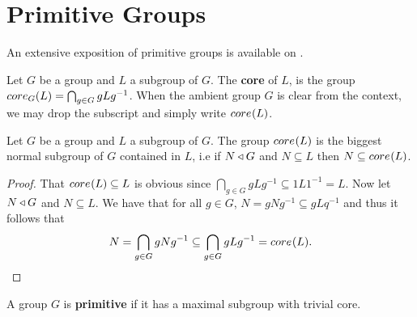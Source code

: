 \section{Primitive Groups}

An extensive exposition of primitive groups is available on \cite{Ballester-BolinchesCFG}.

\begin{definition}
    Let $G$ be a group and $L$ a subgroup of $G$. The \textbf{core} of $L$, is the group $\core[G]{L} = \bigcap_{g \in G} gLg^{-1}$. 
    When the ambient group $G$ is clear from the context, we may drop the subscript and simply write $\core{L}$. 
\end{definition}

\begin{theorem}
    Let $G$ be a group and $L$ a subgroup of $G$. The group $\core{L}$ is the biggest normal subgroup of $G$ contained in $L$, i.e if $N \nsub G$ and $N \subseteq L$ then $N \subseteq \core{L}$.
\end{theorem}

\begin{proof}
    That $\core{L} \subseteq L$ is obvious since $\bigcap_{g \in G} gLg^{-1} \subseteq 1L1^{-1} = L$. Now let $N \nsub G$ and $N \subseteq L$. We have that for all $g \in G$, $N = gNg^{-1} \subseteq gLq^{-1}$ and thus it follows that 
    $$
    N = \bigcap_{g \in G} gNg^{-1} \subseteq \bigcap_{g \in G} gLg^{-1} = \core{L}.
    $$
\end{proof}

\begin{definition}
    A group $G$ is \textbf{primitive} if it has a maximal subgroup with trivial core.
\end{definition}